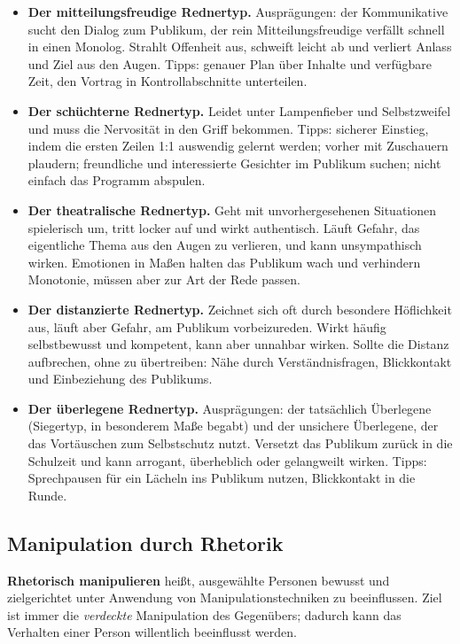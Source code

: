 \documentclass[12pt, a4paper]{article}
\begin{document}
\begin{itemize}
  \item \textbf{Der mitteilungsfreudige Rednertyp.} Ausprägungen: der
        Kommunikative sucht den Dialog zum Publikum, der rein
        Mitteilungsfreudige verfällt schnell in einen Monolog. Strahlt
        Offenheit aus, schweift leicht ab und verliert Anlass und Ziel aus
        den Augen. Tipps: genauer Plan über Inhalte und verfügbare Zeit, den
        Vortrag in Kontrollabschnitte unterteilen.
  \item \textbf{Der schüchterne Rednertyp.} Leidet unter Lampenfieber und
        Selbstzweifel und muss die Nervosität in den Griff bekommen. Tipps:
        sicherer Einstieg, indem die ersten Zeilen 1:1 auswendig gelernt
        werden; vorher mit Zuschauern plaudern; freundliche und interessierte
        Gesichter im Publikum suchen; nicht einfach das Programm abspulen.
  \item \textbf{Der theatralische Rednertyp.} Geht mit unvorhergesehenen
        Situationen spielerisch um, tritt locker auf und wirkt authentisch.
        Läuft Gefahr, das eigentliche Thema aus den Augen zu verlieren, und
        kann unsympathisch wirken. Emotionen in Maßen halten das Publikum
        wach und verhindern Monotonie, müssen aber zur Art der Rede passen.
  \item \textbf{Der distanzierte Rednertyp.} Zeichnet sich oft durch besondere
        Höflichkeit aus, läuft aber Gefahr, am Publikum vorbeizureden. Wirkt
        häufig selbstbewusst und kompetent, kann aber unnahbar wirken. Sollte
        die Distanz aufbrechen, ohne zu übertreiben: Nähe durch
        Verständnisfragen, Blickkontakt und Einbeziehung des Publikums.
  \item \textbf{Der überlegene Rednertyp.} Ausprägungen: der tatsächlich
        Überlegene (Siegertyp, in besonderem Maße begabt) und der unsichere
        Überlegene, der das Vortäuschen zum Selbstschutz nutzt. Versetzt das
        Publikum zurück in die Schulzeit und kann arrogant, überheblich oder
        gelangweilt wirken. Tipps: Sprechpausen für ein Lächeln ins Publikum
        nutzen, Blickkontakt in die Runde.
\end{itemize}

\subsection{Manipulation durch Rhetorik}

\begin{definitionbox}
\textbf{Rhetorisch manipulieren} heißt, ausgewählte Personen bewusst und
zielgerichtet unter Anwendung von Manipulationstechniken zu beeinflussen.
Ziel ist immer die \emph{verdeckte} Manipulation des Gegenübers; dadurch kann
das Verhalten einer Person willentlich beeinflusst werden.
\end{definitionbox}
\end{document}
